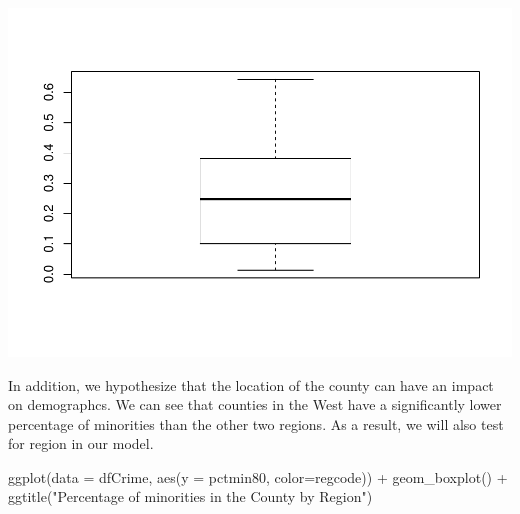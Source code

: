 \documentclass[]{article}
\newenvironment{Shaded}{}{}
\newcommand{\DataTypeTok}[1]{#1}
\newcommand{\KeywordTok}[1]{\textcolor[rgb]{0.00,0.00,1.00}{#1}}
\newcommand{\NormalTok}[1]{#1}
\newcommand{\OperatorTok}[1]{#1}
\newcommand{\StringTok}[1]{\textcolor[rgb]{0.00,0.50,0.50}{#1}}
\begin{document}
\begin{Shaded}
\end{Shaded}

\includegraphics{Bagnard_Gaustad_Hartman_Leung_Lab_3_files/figure-latex/unnamed-chunk-92-1.pdf}

In addition, we hypothesize that the location of the county can have an
impact on demographcs. We can see that counties in the West have a
significantly lower percentage of minorities than the other two regions.
As a result, we will also test for region in our model.

\begin{Shaded}
\begin{Highlighting}[]
\KeywordTok{ggplot}\NormalTok{(}\DataTypeTok{data =}\NormalTok{ dfCrime, }\KeywordTok{aes}\NormalTok{(}\DataTypeTok{y =}\NormalTok{ pctmin80, }\DataTypeTok{color=}\NormalTok{regcode)) }\OperatorTok{+}\StringTok{ }
\StringTok{      }\KeywordTok{geom_boxplot}\NormalTok{() }\OperatorTok{+}\StringTok{ }\KeywordTok{ggtitle}\NormalTok{(}\StringTok{"Percentage of minorities in the County by Region"}\NormalTok{)}
\end{Highlighting}
\end{Shaded}
\end{document}
